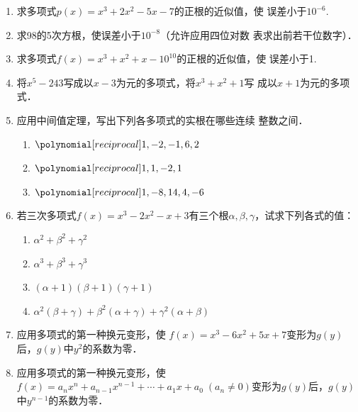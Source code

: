 \begin{enumerate}
\item 求多项式$p(x)=x^3+2x^2-5x-7$的正根的近似值，使
误差小于$10^{-6}$.

\item 求98的5次方根，使误差小于$10^{-8}$（允许应用四位对数
表求出前若干位数字）．

\item 求多项式$f(x)=x^3+x^2+x-10^{10}$的正根的近似值，使
误差小于1.

\item 将$x^5-243$写成以$x-3$为元的多项式，将$x^3+x^2+1$写
成以$x+1$为元的多项式．

\item 应用中间值定理，写出下列各多项式的实根在哪些连续
整数之间．
\begin{enumerate}
    \item $\poly{1,-2,-1,6,2}$
    \item $\poly{1,1,-2,1}$
    \item $\poly{1,-8,14,4,-6}$
\end{enumerate}

\item 若三次多项式$f(x)=x^3-2x^2-x+3$有三个根$\alpha,\beta,\gamma$，试求下列各式的值：
\begin{enumerate}
    \item $\alpha^2+\beta^2+\gamma^2$
    \item $\alpha^3+\beta^3+\gamma^3$
    \item $(\alpha+1)(\beta+1)(\gamma+1)$
    \item $\alpha^2(\beta+\gamma)+\beta^2(\alpha+\gamma)+\gamma^2(\alpha+\beta)$
\end{enumerate}


\item 应用多项式的第一种换元变形，使
$f (x) =x^3-6x^2+5x+7$变形为$g(y)$后，$g(y)$中$y^2$的系数为零．
\item 应用多项式的第一种换元变形，使
$f (x) =a_nx^n+a_{n-1}x^{n-1}+\cdots +a_1x+a_0\;  (a_n\ne 0)$变形为$g(y)$后，$g(y)$中$y^{n-1}$的系数为零．


\end{enumerate}
